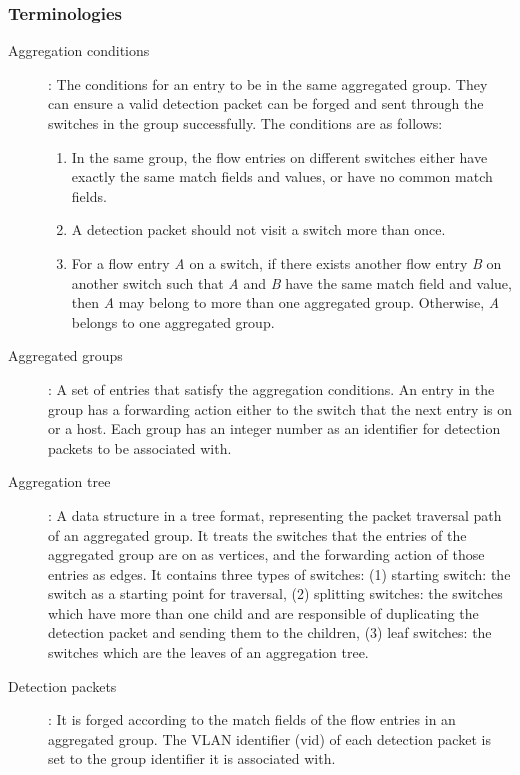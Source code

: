 \documentclass[conference]{IEEEtran}
\begin{document}
\subsubsection{Terminologies}

\begin{description}%

\item
[Aggregation conditions]:
The conditions for an entry to be in the same aggregated group. They can ensure a valid detection packet can be forged and sent through the switches in the group successfully. The conditions are as follows:
\begin{enumerate}
\item
In the same group, the flow entries on different switches either have exactly the same match fields and values, or have no common match fields.
\item
A detection packet should not visit a switch more than once.
\item
For a flow entry \textit{A} on a switch, if there exists another flow entry \textit{B} on another switch such that \textit{A} and \textit{B} have the same match field and value, then \textit{A} may belong to more than one aggregated group. Otherwise, \textit{A} belongs to one aggregated group.

\end{enumerate}

\item
[Aggregated groups]: 
A set of entries that satisfy the aggregation conditions. An entry in the group has a forwarding action either to the switch that the next entry is on or a host. Each group has an integer number as an identifier for detection packets to be associated with.

\item 
[Aggregation tree]:
A data structure in a tree format, representing the packet traversal path of an aggregated group. It treats the switches that the entries of the aggregated group are on as vertices, and the forwarding action of those entries as edges. It contains three types of switches: (1) starting switch: the switch as a starting point for traversal, (2) splitting switches: the switches which have more than one child and are responsible of duplicating the detection packet and sending them to the children, (3) leaf switches: the switches which are the leaves of an aggregation tree.

\item
[Detection packets]:
It is forged according to the match fields of the flow entries in an aggregated group. The VLAN identifier (vid) of each detection packet is set to the group identifier it is associated with.


\end{description}
\end{document}
